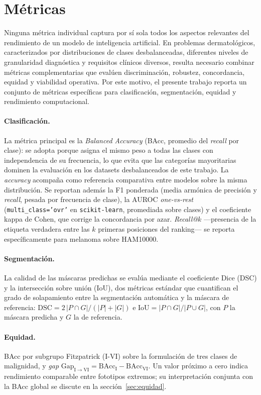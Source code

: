 \section{Métricas}
\label{sec:metricas}

Ninguna métrica individual captura por sí sola todos los aspectos
relevantes del rendimiento de un modelo de inteligencia artificial.
En problemas dermatológicos, caracterizados por distribuciones de
clases desbalanceadas, diferentes niveles de granularidad
diagnóstica y requisitos clínicos diversos, resulta necesario
combinar métricas complementarias que evalúen discriminación,
robustez, concordancia, equidad y viabilidad operativa. Por este
motivo, el presente trabajo reporta un conjunto de métricas
específicas para clasificación, segmentación, equidad y rendimiento
computacional.

\paragraph{Clasificación.}
La métrica principal es la \emph{Balanced Accuracy} (BAcc, promedio
del \emph{recall} por clase): se adopta porque asigna el mismo peso
a todas las clases con independencia de su frecuencia, lo que evita
que las categorías mayoritarias dominen la evaluación en los
datasets desbalanceados de este trabajo. La \emph{accuracy} acompaña
como referencia comparativa
entre modelos sobre la misma distribución. Se reportan además la F1
ponderada (media armónica de precisión y \emph{recall}, pesada por
frecuencia de clase), la AUROC \emph{one-vs-rest}
(\texttt{multi\_class='ovr'} en \texttt{scikit-learn}, promediada
sobre clases) y el coeficiente kappa de Cohen, que corrige la
concordancia por azar. \emph{Recall@$k$} —presencia de la etiqueta
verdadera entre las $k$ primeras posiciones del ranking— se reporta
específicamente para melanoma sobre HAM10000.

\paragraph{Segmentación.}
La calidad de las máscaras predichas se evalúa mediante el
coeficiente Dice (DSC) y la intersección sobre unión (IoU), dos
métricas estándar que cuantifican el grado de solapamiento entre la
segmentación automática y la máscara de referencia:
$\mathrm{DSC} = 2\,|P\cap G|/(|P|+|G|)$ e
$\mathrm{IoU} = |P\cap G|/|P\cup G|$, con $P$ la máscara predicha y
$G$ la de referencia.

\paragraph{Equidad.}
BAcc por subgrupo Fitzpatrick (I-VI) sobre la formulación de tres
clases de malignidad, y \emph{gap}
$\mathrm{Gap}_{\mathrm{I}\to\mathrm{VI}}
= \mathrm{BAcc}_{\mathrm{I}} - \mathrm{BAcc}_{\mathrm{VI}}$. Un
valor próximo a cero indica rendimiento comparable entre fototipos
extremos; su interpretación conjunta con la BAcc global se discute en
la sección~\ref{sec:equidad}.

